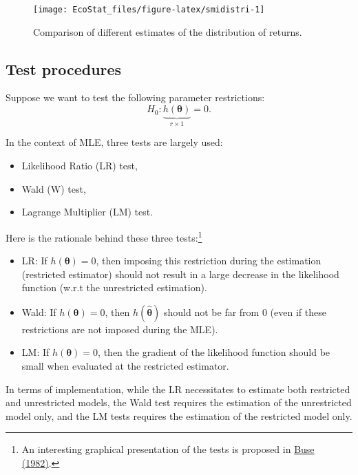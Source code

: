 \documentclass[
  12pt,
]{book}
\providecommand{\tightlist}{%
  \setlength{\itemsep}{0pt}\setlength{\parskip}{0pt}}
\theoremstyle{definition}
\theoremstyle{definition}
\theoremstyle{definition}
\theoremstyle{definition}
\theoremstyle{remark}
\begin{document}
\begin{figure}
\texttt{[image: EcoStat\_files/figure-latex/smidistri-1]} \caption{Comparison of different estimates of the distribution of returns.}\label{fig:smidistri}
\end{figure}

\hypertarget{TestMLE}{%
\subsection{Test procedures}\label{TestMLE}}

Suppose we want to test the following parameter restrictions:
\begin{equation}
\boxed{H_0: \underbrace{h(\boldsymbol\theta)}_{r \times 1}=0.}
\end{equation}

In the context of MLE, three tests are largely used:

\begin{itemize}
\tightlist
\item
  Likelihood Ratio (LR) test,
\item
  Wald (W) test,
\item
  Lagrange Multiplier (LM) test.
\end{itemize}

Here is the rationale behind these three tests:\footnote{An interesting graphical presentation of the tests is proposed in \href{http://hedibert.org/wp-content/uploads/2014/04/LR-W-LM-Tests-Buse1982.pdf}{Buse (1982)}.}

\begin{itemize}
\tightlist
\item
  LR: If \(h(\boldsymbol\theta)=0\), then imposing this restriction during the estimation (restricted estimator) should not result in a large decrease in the likelihood function (w.r.t the unrestricted estimation).
\item
  Wald: If \(h(\boldsymbol\theta)=0\), then \(h(\hat{\boldsymbol\theta})\) should not be far from \(0\) (even if these restrictions are not imposed during the MLE).
\item
  LM: If \(h(\boldsymbol\theta)=0\), then the gradient of the likelihood function should be small when evaluated at the restricted estimator.
\end{itemize}

In terms of implementation, while the LR necessitates to estimate both restricted and unrestricted models, the Wald test requires the estimation of the unrestricted model only, and the LM tests requires the estimation of the restricted model only.
\end{document}
